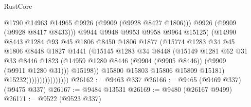 \begin{lexlean}{RustCore}
\begin{coremodule}
                                        @1790
                                        @14963
                                        @14965
                                        @9926
                                        (@9909 (@9928 @8427 @1806)))
                                      @9926
                                      (@9909 (@9928 @8417 @8433)))
                                    @9944
                                    @9948
                                    @9953
                                    @9958
                                    @9964
                                    @15125)
                                  (@14990
                                    @8443
                                    @1284
                                    @93
                                    @45
                                    @1806
                                    @8450
                                    @1806
                                    @1877
                                    (@15774
                                      @1283
                                      @34
                                      @45
                                      @1806
                                      @8448
                                      @1827
                                      @1441
                                      (@15145
                                        @1283
                                        @34
                                        @8448
                                        (@15149
                                          @1281
                                          @62
                                          @31
                                          @33
                                          @8446
                                          @1823
                                          (@14959
                                            @1280
                                            @8446
                                            (@9904 (@9905 @8446))
                                            (@9909 (@9911 @1280 @31)))
                                          @15198))
                                      @15800
                                      @15803
                                      @15806
                                      @15809
                                      @15181)
                                    @15232))))))))))))))))
@26162 := @9463 @337
@26166 := @9465 (@9469 @337) (@9475 @337)
@26167 := @9484 @13531
@26169 := @9480 (@26167 @9499)
@26171 := @9522 (@9523 @337)

\end{coremodule}
\end{lexlean}
